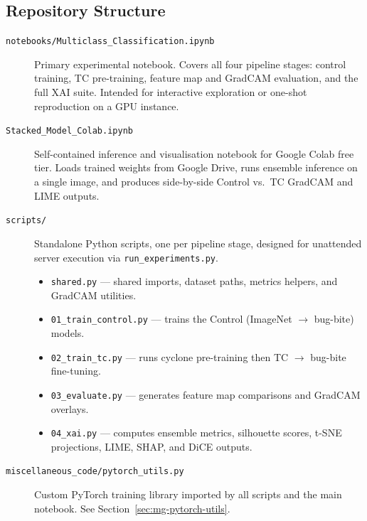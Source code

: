 \documentclass[12pt,a4paper]{article}
\begin{document}
\subsection{Repository Structure}
\label{sec:mg-repo}

\begin{description}
    \item[\texttt{notebooks/Multiclass\_Classification.ipynb}]
          Primary experimental notebook. Covers all four pipeline stages:
          control training, TC pre-training, feature map and GradCAM
          evaluation, and the full XAI suite. Intended for interactive
          exploration or one-shot reproduction on a GPU instance.

    \item[\texttt{Stacked\_Model\_Colab.ipynb}]
          Self-contained inference and visualisation notebook for Google Colab
          free tier. Loads trained weights from Google Drive, runs ensemble
          inference on a single image, and produces side-by-side Control vs.\
          TC GradCAM and LIME outputs.

    \item[\texttt{scripts/}]
          Standalone Python scripts, one per pipeline stage, designed for
          unattended server execution via \texttt{run\_experiments.py}.
          \begin{itemize}
              \item \texttt{shared.py} --- shared imports, dataset paths,
                    metrics helpers, and GradCAM utilities.
              \item \texttt{01\_train\_control.py} --- trains the Control
                    (ImageNet $\rightarrow$ bug-bite) models.
              \item \texttt{02\_train\_tc.py} --- runs cyclone pre-training
                    then TC $\rightarrow$ bug-bite fine-tuning.
              \item \texttt{03\_evaluate.py} --- generates feature map
                    comparisons and GradCAM overlays.
              \item \texttt{04\_xai.py} --- computes ensemble metrics,
                    silhouette scores, t-SNE projections, LIME, SHAP, and
                    DiCE outputs.
          \end{itemize}

    \item[\texttt{miscellaneous\_code/pytorch\_utils.py}]
          Custom PyTorch training library imported by all scripts and the
          main notebook. See Section~\ref{sec:mg-pytorch-utils}.


\end{description}
\end{document}
